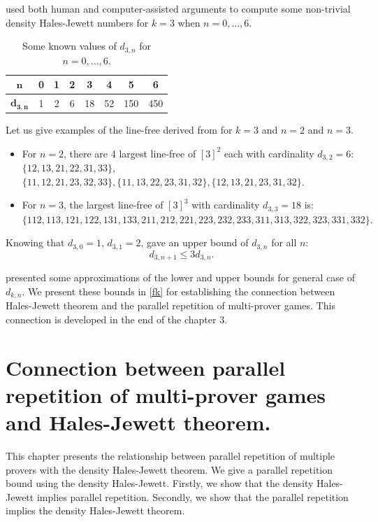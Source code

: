 \cite{polymath2010density} used both human and computer-assisted arguments to compute some non-trivial density Hales-Jewett numbers for $k=3$ when $n= 0,\ldots,6.$

\begin{table}[h]
\centering
\begin{tabular}{|c|c|c|c|c|c|c|c|}
\hline 
$\mathbf{n}$ & 0 & 1 & 2 & 3 & 4 & 5 & 6 \\ 
\hline 
$\mathbf{d_{3,n}}$ & 1 & 2 & 6 & 18 & 52 & 150 & 450 \\ 
\hline 
\end{tabular}
\caption{Some known values of $d_{3,n}$ for $ n= 0,\ldots,6.$}
\end{table} 

Let us give examples of the line-free derived from \cite{polymath2010density} for $k=3$ and $n=2$ and $n=3.$
\begin{itemize}
\item For $n=2$, there are 4 largest line-free of $[3]^2$ each with cardinality $d_{3,2}=6 :$ $ \{12, 13, 21, 22, 31, 33 \}$, $\{11, 12, 21, 23, 32, 33 \}, \{11, 13, 22, 23, 31, 32 \}, \{12, 13, 21, 23, 31, 32 \}.$
\item For $n=3$, the largest line-free of $[3]^3$ with cardinality $d_{3,3}=18$ is: $\{112, 113, 121, 122, 131, 133, 211, 212, 221, 223, 232, 233, 311, 313, 322, 323, 331, 332 \}.$
\end{itemize}

Knowing that $d_{3,0}=1$, $d_{3,1}=2$,  \cite{polymath2010density} gave an upper bound of $d_{3,n}$ for all $n$: $$d_{3,n+1} \leq 3 d_{3,n}.$$

\cite{polymath2010density} presented some approximations of the lower and upper bounds for general case of $d_{k,n}.$ We present these bounds in \eqref{fk} for establishing the connection between Hales-Jewett theorem and the parallel repetition of multi-prover games. This connection is developed in the end of the  chapter 3. 



\chapter{Connection between parallel repetition of multi-prover games and  Hales-Jewett theorem.}

This chapter presents the relationship between parallel repetition of multiple provers with the density Hales-Jewett theorem. We give a parallel repetition bound using the density Hales-Jewett. Firstly, we show that the density Hales-Jewett implies parallel repetition. Secondly, we show that the parallel repetition implies the density Hales-Jewett theorem.

